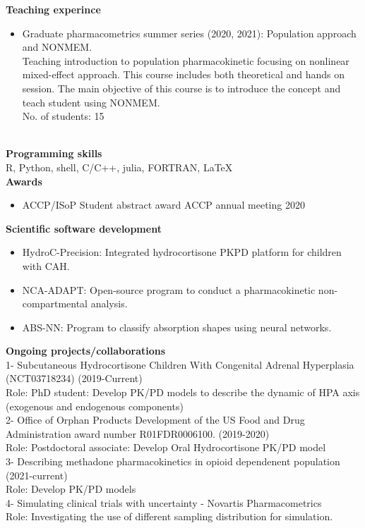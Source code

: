 \documentclass[a4paper,11pt]{article}
\begin{document}
\textbf{Teaching experince} \\
\begin{itemize}
\item Graduate pharmacometrics summer series (2020, 2021): Population approach and NONMEM.
~\\
Teaching introduction to population pharmacokinetic focusing on nonlinear mixed-effect approach. This course includes both theoretical and hands on session. The main objective of this course is to introduce the concept and teach student using NONMEM. 
~\\ 
No. of students: 15    
\end{itemize}
~\\
\textbf{Programming skills}\\
R, Python, shell, C/C++, julia, FORTRAN, LaTeX\\
\textbf{Awards} \\

\begin{itemize}
\item ACCP/ISoP Student abstract award \hfill ACCP annual meeting 2020
\end{itemize}

\textbf{Scientific software development} \\
\begin{itemize}
\item HydroC-Precision: Integrated hydrocortisone PKPD platform for children with CAH.
\item NCA-ADAPT: Open-source program to conduct a pharmacokinetic non-compartmental analysis. 
\item ABS-NN: Program to classify absorption shapes using neural networks. 
\end{itemize}

\textbf{Ongoing projects/collaborations}\\
1- Subcutaneous Hydrocortisone Children With Congenital Adrenal Hyperplasia (NCT03718234) (2019-Current)
~\\
Role: PhD student: Develop PK/PD models to describe the dynamic of HPA axis (exogenous and endogenous components)
~\\
2- Office of Orphan Products Development of the US Food and Drug Administration award number R01FDR0006100. (2019-2020)
~\\
Role: Postdoctoral associate: Develop Oral Hydrocortisone PK/PD model
~\\
3- Describing methadone pharmacokinetics in opioid dependenent population (2021-current)
~\\
Role: Develop PK/PD models 
~\\
4- Simulating clinical trials with uncertainty - Novartis Pharmacometrics 
~\\
Role: Investigating the use of different sampling distribution for simulation. 
~\\
\nocite{*}
\printbibliography[title=Publications, keyword=papers]
\end{document}
